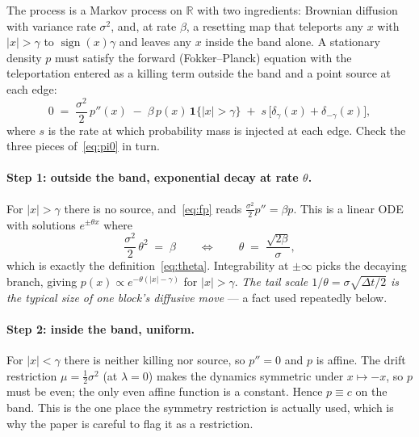 \documentclass[11pt]{article}
\theoremstyle{definition}
\theoremstyle{remark}
\newcommand{\R}{\mathbb{R}}
\newcommand{\dt}{\Delta t}
\newcommand{\1}{\mathbf{1}}
\DeclareMathOperator{\sgn}{sign}
\begin{document}
The process is a Markov process on $\R$ with two ingredients: Brownian diffusion with variance rate $\sigma^2$, and, at rate $\beta$, a resetting map that teleports any $x$ with $|x| > \gamma$ to $\sgn(x)\gamma$ and leaves any $x$ inside the band alone. A stationary density $p$ must satisfy the forward (Fokker--Planck) equation with the teleportation entered as a killing term outside the band and a point source at each edge:
\begin{equation}\label{eq:fp}
0 \;=\; \frac{\sigma^2}{2}\,p''(x) \;-\; \beta\,p(x)\,\1\{|x|>\gamma\} \;+\; s\,\big[\delta_\gamma(x) + \delta_{-\gamma}(x)\big],
\end{equation}
where $s$ is the rate at which probability mass is injected at each edge. Check the three pieces of~\eqref{eq:pi0} in turn.

\paragraph{Step 1: outside the band, exponential decay at rate $\theta$.}
For $|x| > \gamma$ there is no source, and~\eqref{eq:fp} reads $\tfrac{\sigma^2}{2}p'' = \beta p$. This is a linear ODE with solutions $e^{\pm\theta x}$ where
\[
\frac{\sigma^2}{2}\,\theta^2 \;=\; \beta
\qquad\Longleftrightarrow\qquad
\theta \;=\; \frac{\sqrt{2\beta}}{\sigma},
\]
which is exactly the definition~\eqref{eq:theta}. Integrability at $\pm\infty$ picks the decaying branch, giving $p(x) \propto e^{-\theta(|x|-\gamma)}$ for $|x| > \gamma$. \emph{The tail scale $1/\theta = \sigma\sqrt{\dt/2}$ is the typical size of one block's diffusive move} --- a fact used repeatedly below.

\paragraph{Step 2: inside the band, uniform.}
For $|x| < \gamma$ there is neither killing nor source, so $p'' = 0$ and $p$ is affine. The drift restriction $\mu = \tfrac12\sigma^2$ (at $\lambda=0$) makes the dynamics symmetric under $x \mapsto -x$, so $p$ must be even; the only even affine function is a constant. Hence $p \equiv c$ on the band. This is the one place the symmetry restriction is actually used, which is why the paper is careful to flag it as a restriction.
\end{document}
